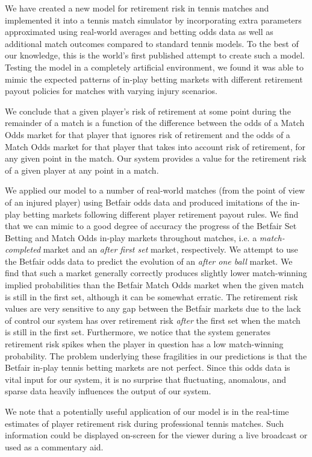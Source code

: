 \documentclass[letterpaper,12pt]{article}
\begin{document}
We have created a new model for retirement risk in tennis matches and implemented it into a tennis match simulator by incorporating extra parameters approximated using real-world averages and betting odds data as well as additional match outcomes compared to standard tennis models.  To the best of our knowledge, this is the world's first published attempt to create such a model.  Testing the model in a completely artificial environment, we found it was able to mimic the expected patterns of in-play betting markets with different retirement payout policies for matches with varying injury scenarios.

We conclude that a given player's risk of retirement at some point during the remainder of a match is a function of the difference between the odds of a Match Odds market for that player that ignores risk of retirement and the odds of a Match Odds market for that player that takes into account risk of retirement, for any given point in the match.  Our system provides a value for the retirement risk of a given player at any point in a match.

We applied our model to a number of real-world matches (from the point of view of an injured player) using Betfair odds data and produced imitations of the in-play betting markets following different player retirement payout rules.  We find that we can mimic to a good degree of accuracy the progress of the Betfair Set Betting and Match Odds in-play markets throughout matches, i.e. a \textit{match-completed} market and an \textit{after first set} market, respectively.  We attempt to use the Betfair odds data to predict the evolution of an \textit{after one ball} market.  We find that such a market generally correctly produces slightly lower match-winning implied probabilities than the Betfair Match Odds market when the given match is still in the first set, although it can be somewhat erratic.  The retirement risk values are very sensitive to any gap between the Betfair markets due to the lack of control our system has over retirement risk \textit{after} the first set when the match is still in the first set.  Furthermore, we notice that the system generates retirement risk spikes when the player in question has a low match-winning probability.  The problem underlying these fragilities in our predictions is that the Betfair in-play tennis betting markets are not perfect.  Since this odds data is vital input for our system, it is no surprise that fluctuating, anomalous, and sparse data heavily influences the output of our system.

We note that a potentially useful application of our model is in the real-time estimates of player retirement risk during professional tennis matches.  Such information could be displayed on-screen for the viewer during a live broadcast or used as a commentary aid.



\end{document}
